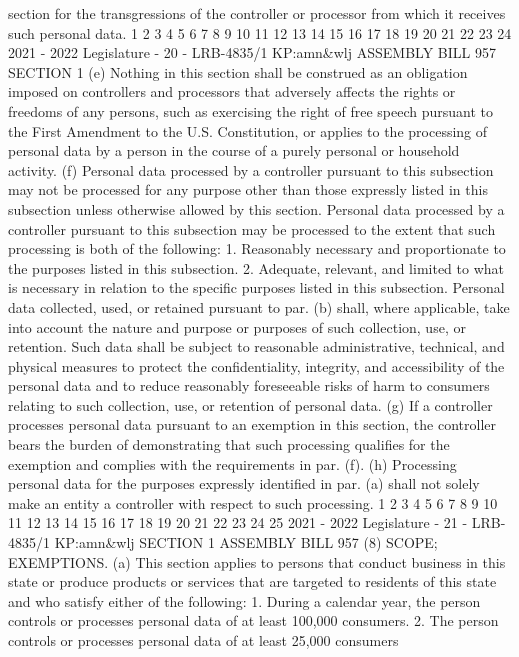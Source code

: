 section for the transgressions of the controller or processor from which it receives
such personal data.
1
2
3
4
5
6
7
8
9
10
11
12
13
14
15
16
17
18
19
20
21
22
23
24
2021 - 2022 Legislature - 20 - LRB-4835/1
KP:amn&wlj
 ASSEMBLY BILL 957 SECTION 1
(e) Nothing in this section shall be construed as an obligation imposed on
controllers and processors that adversely affects the rights or freedoms of any
persons, such as exercising the right of free speech pursuant to the First Amendment
to the U.S. Constitution, or applies to the processing of personal data by a person in
the course of a purely personal or household activity.
(f) Personal data processed by a controller pursuant to this subsection may not
be processed for any purpose other than those expressly listed in this subsection
unless otherwise allowed by this section. Personal data processed by a controller
pursuant to this subsection may be processed to the extent that such processing is
both of the following:
1. Reasonably necessary and proportionate to the purposes listed in this
subsection.
2. Adequate, relevant, and limited to what is necessary in relation to the
specific purposes listed in this subsection. Personal data collected, used, or retained
pursuant to par. (b) shall, where applicable, take into account the nature and purpose
or purposes of such collection, use, or retention. Such data shall be subject to
reasonable administrative, technical, and physical measures to protect the
confidentiality, integrity, and accessibility of the personal data and to reduce
reasonably foreseeable risks of harm to consumers relating to such collection, use,
or retention of personal data.
(g) If a controller processes personal data pursuant to an exemption in this
section, the controller bears the burden of demonstrating that such processing
qualifies for the exemption and complies with the requirements in par. (f).
(h) Processing personal data for the purposes expressly identified in par. (a)
shall not solely make an entity a controller with respect to such processing.
1
2
3
4
5
6
7
8
9
10
11
12
13
14
15
16
17
18
19
20
21
22
23
24
25
2021 - 2022 Legislature - 21 - LRB-4835/1
KP:amn&wlj
SECTION 1 ASSEMBLY BILL 957
(8) SCOPE; EXEMPTIONS. (a) This section applies to persons that conduct
business in this state or produce products or services that are targeted to residents
of this state and who satisfy either of the following:
1. During a calendar year, the person controls or processes personal data of at
least 100,000 consumers.
2. The person controls or processes personal data of at least 25,000 consumers
